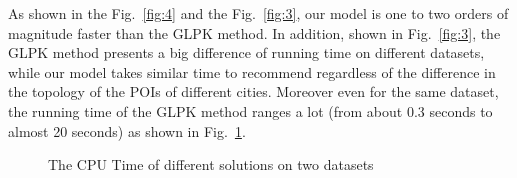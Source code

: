\documentclass[runningheads]{llncs}
\begin{document}
As shown in the Fig.~\ref{fig:4} and the Fig.~\ref{fig:3}, our model is one to two orders of magnitude faster than the GLPK method. In addition, shown in Fig.~\ref{fig:3}, the GLPK method presents a big difference of running time on different datasets, while our model takes similar time to recommend regardless of the difference in the topology of the POIs of different cities. Moreover even for the same dataset, the running time of the GLPK method ranges a lot (from about 0.3 seconds to almost 20 seconds) as shown in Fig.~\ref{fig:7}.  
\begin{figure}[htbp]
	\centering
	\quad
	\caption{The CPU Time of different solutions on two datasets}
	\label{fig:7}
\end{figure}
\end{document}
